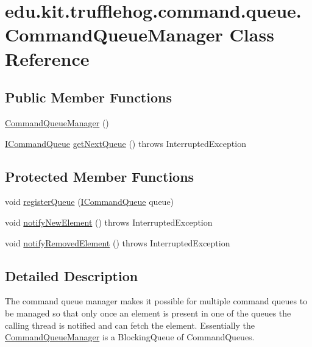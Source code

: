\hypertarget{classedu_1_1kit_1_1trufflehog_1_1command_1_1queue_1_1_command_queue_manager}{}\section{edu.\+kit.\+trufflehog.\+command.\+queue.\+Command\+Queue\+Manager Class Reference}
\label{classedu_1_1kit_1_1trufflehog_1_1command_1_1queue_1_1_command_queue_manager}
\subsection*{Public Member Functions}
\begin{DoxyCompactItemize}
\item 
\hyperlink{classedu_1_1kit_1_1trufflehog_1_1command_1_1queue_1_1_command_queue_manager_a30e1f24537977773a3e63e7da9caea36}{Command\+Queue\+Manager} ()
\item 
\hyperlink{interfaceedu_1_1kit_1_1trufflehog_1_1command_1_1queue_1_1_i_command_queue}{I\+Command\+Queue} \hyperlink{classedu_1_1kit_1_1trufflehog_1_1command_1_1queue_1_1_command_queue_manager_ab2d3dd74a53b8a012260d8c29bb35772}{get\+Next\+Queue} ()  throws Interrupted\+Exception 
\end{DoxyCompactItemize}
\subsection*{Protected Member Functions}
\begin{DoxyCompactItemize}
\item 
void \hyperlink{classedu_1_1kit_1_1trufflehog_1_1command_1_1queue_1_1_command_queue_manager_aa53bc947ab4e03a9c0c59fb6f0e4ebc8}{register\+Queue} (\hyperlink{interfaceedu_1_1kit_1_1trufflehog_1_1command_1_1queue_1_1_i_command_queue}{I\+Command\+Queue} queue)
\item 
void \hyperlink{classedu_1_1kit_1_1trufflehog_1_1command_1_1queue_1_1_command_queue_manager_ac230c474e3af5968872ab96afea64c83}{notify\+New\+Element} ()  throws Interrupted\+Exception 
\item 
void \hyperlink{classedu_1_1kit_1_1trufflehog_1_1command_1_1queue_1_1_command_queue_manager_afadc515ae2540edf379193155f3f6dad}{notify\+Removed\+Element} ()  throws Interrupted\+Exception 
\end{DoxyCompactItemize}


\subsection{Detailed Description}
The command queue manager makes it possible for multiple command queues to be managed so that only once an element is present in one of the queues the calling thread is notified and can fetch the element. Essentially the \hyperlink{classedu_1_1kit_1_1trufflehog_1_1command_1_1queue_1_1_command_queue_manager}{Command\+Queue\+Manager} is a Blocking\+Queue of Command\+Queues. 

